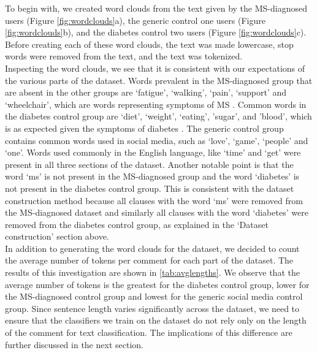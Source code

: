 \documentclass[11pt,a4paper]{article}
\begin{document}
\indent To begin with, we created word clouds from the text given by the MS-diagnosed users (Figure \ref{fig:wordclouds}a), the generic control one users (Figure \ref{fig:wordclouds}b), and the diabetes control two users (Figure \ref{fig:wordclouds}c).  Before creating each of these word clouds, the text was made lowercase, stop words were removed from the text, and the text was tokenized. \\
\indent Inspecting the word clouds, we see that it is consistent with our expectations of the various parts of the dataset. Words prevalent in the MS-diagnosed group that are absent in the other groups are ‘fatigue’, ‘walking’, ‘pain’, ‘support’ and ‘wheelchair’, which are words representing symptoms of MS \citep{Gustavsen:21}. Common words in the diabetes control group are ‘diet’, ‘weight’, ‘eating’, 'sugar', and 'blood', which is as expected given the symptoms of diabetes \citep{Ramachandran:14}. The generic control group contains common words used in social media, such as ‘love’, ‘game’, ‘people’ and ‘one’. Words used commonly in the English language, like ‘time’ and ‘get’ were present in all three sections of the dataset. Another notable point is that the word ‘ms’ is not present in the MS-diagnosed group and the word ‘diabetes’ is not present in the diabetes control group. This is consistent with the dataset construction method because all clauses with the word ‘ms’ were removed from the MS-diagnosed dataset and similarly all clauses with the word ‘diabetes’ were removed from the diabetes control group, as explained in the ‘Dataset construction’ section above. \\
\indent In addition to generating the word clouds for the dataset, we decided to count the average number of tokens per comment for each part of the dataset. The results of this investigation are shown in \autoref{tab:avglengths}. We observe that the average number of tokens is the greatest for the diabetes control group, lower for the MS-diagnosed control group and lowest for the generic social media control group. Since sentence length varies significantly across the dataset, we need to ensure that the classifiers we train on the dataset do not rely only on the length of the comment for text classification. The implications of this difference are further discussed in the next section.
\end{document}
